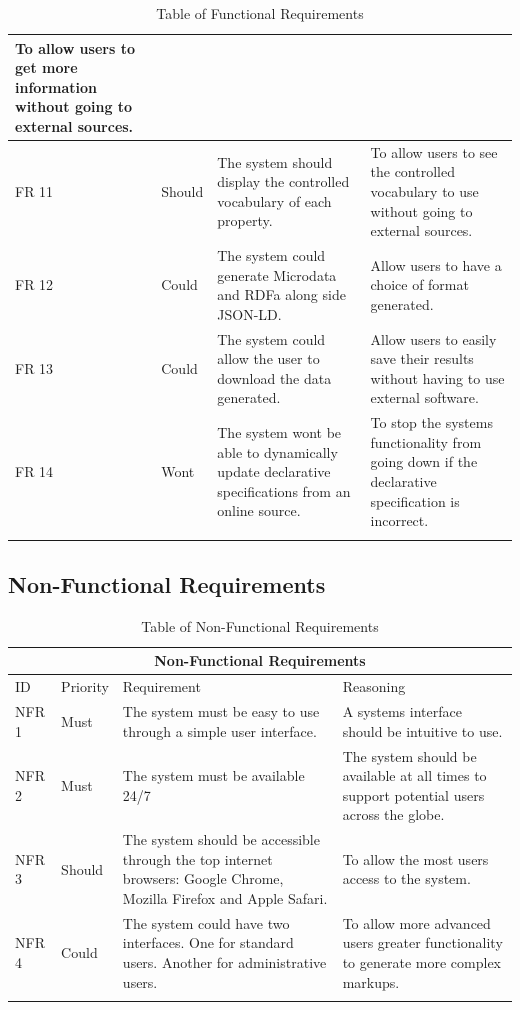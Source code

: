 {\begin{longtable}{ |p{1.5cm}|p{1.75cm}|p{5cm}|p{5cm}|  }
 To allow users to get more information without going to external sources. \\
  \hline
  FR 11   & Should  & The system should display the controlled vocabulary of each property.&
 To allow users to see the controlled vocabulary to use without going to external sources. \\
  \hline
 FR 12  & Could    & The system could generate Microdata and RDFa along side JSON-LD.& 
 Allow users to have a choice of format generated.\\
  \hline
 FR 13  & Could    & The system could allow the user to download the data generated. & Allow users to easily save their results without having to use external software.\\
  \hline
 FR 14   & Wont    & The system wont be able to dynamically update declarative specifications from an online source. &
 To stop the systems functionality from going down if the declarative specification is incorrect. \\
 \hline
 \caption{Table of Functional Requirements}
 \label{table:2}
\end{longtable}


\subsection{Non-Functional Requirements}

\begin{longtable}{ |p{1.5cm}|p{1.75cm}|p{5cm}|p{5cm}|}
 \hline
 \multicolumn{4}{|c|}{Non-Functional Requirements} \\
 \hline
 ID & Priority &Requirement& Reasoning\\
 \hline
 NFR 1   & Must &The system must be easy to use through a simple user interface.&
 A systems interface should be intuitive to use.\\
 \hline
 NFR 2   & Must &The system must be available 24/7 &
 The system should be available at all times to support potential users across the globe. \\
 \hline
 NFR 3   & Should &The system should be accessible through the top internet browsers: Google Chrome, Mozilla Firefox and Apple Safari. &
 To allow the most users access to the system.\\
 \hline
 NFR 4   & Could &The system could have two interfaces. One for standard users. Another for administrative users. &
 To allow more advanced users greater functionality to generate more complex markups.\\
 \hline
 \caption{Table of Non-Functional Requirements}
\label{table:3}
\end{longtable}

}